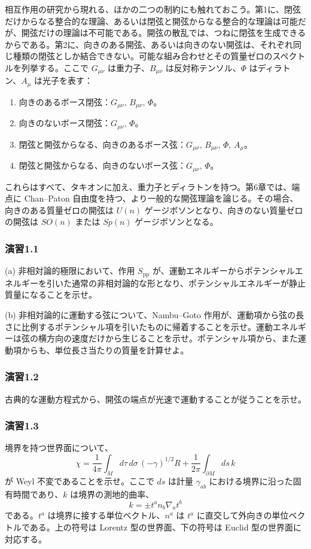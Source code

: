 相互作用の研究から現れる、ほかの二つの制約にも触れておこう。第1に、閉弦だけからなる整合的な理論、あるいは閉弦と開弦からなる整合的な理論は可能だが、開弦だけの理論は不可能である。開弦の散乱では、つねに閉弦を生成できるからである。第2に、向きのある開弦、あるいは向きのない開弦は、それぞれ同じ種類の閉弦としか結合できない。可能な組み合わせとその質量ゼロのスペクトルを列挙する。ここで $G_{\mu\nu}$ は重力子、$B_{\mu\nu}$ は反対称テンソル、$\Phi$ はディラトン、$A_\mu$ は光子を表す：
\begin{enumerate}
\item 向きのあるボース閉弦：$G_{\mu\nu},\,B_{\mu\nu},\,\Phi$。
\item 向きのないボース閉弦：$G_{\mu\nu},\,\Phi$。
\item 閉弦と開弦からなる、向きのあるボース弦：$G_{\mu\nu},\,B_{\mu\nu},\,\Phi,\,A_\mu$。
\item 閉弦と開弦からなる、向きのないボース弦：$G_{\mu\nu},\,\Phi$。
\end{enumerate}
これらはすべて、タキオンに加え、重力子とディラトンを持つ。第6章では、端点に Chan--Paton 自由度を持つ、より一般的な開弦理論を論じる。その場合、向きのある質量ゼロの開弦は $U(n)$ ゲージボソンとなり、向きのない質量ゼロの開弦は $SO(n)$ または $Sp(n)$ ゲージボソンとなる。

\label{sec:1.exercises}

\subsubsection*{演習1.1}\label{ex:1.1}
(a) 非相対論的極限において、作用 $S_{\mathrm{pp}}$ が、運動エネルギーからポテンシャルエネルギーを引いた通常の非相対論的な形となり、ポテンシャルエネルギーが静止質量になることを示せ。

\noindent
(b) 非相対論的に運動する弦について、Nambu--Goto 作用が、運動項から弦の長さに比例するポテンシャル項を引いたものに帰着することを示せ。運動エネルギーは弦の横方向の速度だけから生じることを示せ。ポテンシャル項から、また運動項からも、単位長さ当たりの質量を計算せよ。

\medskip
\subsubsection*{演習1.2}\label{ex:1.2}
古典的な運動方程式から、開弦の端点が光速で運動することが従うことを示せ。

\medskip
\subsubsection*{演習1.3}\label{ex:1.3}
境界を持つ世界面について、
\[
\chi=\frac1{4\pi}\int_M d\tau\,d\sigma\,(-\gamma)^{1/2}R
+\frac1{2\pi}\int_{\partial M}ds\,k
\]
が Weyl 不変であることを示せ。ここで $ds$ は計量 $\gamma_{ab}$ における境界に沿った固有時間であり、$k$ は境界の測地的曲率、
\[
k=\pm t^a n_b\nabla_a t^b
\]
である。$t^a$ は境界に接する単位ベクトル、$n^a$ は $t^a$ に直交して外向きの単位ベクトルである。上の符号は Lorentz 型の世界面、下の符号は Euclid 型の世界面に対応する。

